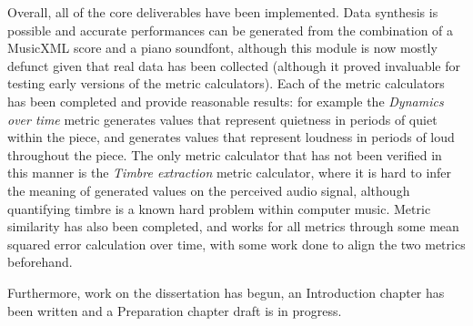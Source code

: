 \documentclass{article}
\begin{document}
Overall, all of the core deliverables have been implemented. Data synthesis is possible and accurate performances can be generated from the combination of a MusicXML score and a piano soundfont, although this module is now mostly defunct given that real data has been collected (although it proved invaluable for testing early versions of the metric calculators). Each of the metric calculators has been completed and provide reasonable results: for example the \textit{Dynamics over time} metric generates values that represent quietness in periods of quiet within the piece, and generates values that represent loudness in periods of loud throughout the piece. The only metric calculator that has not been verified in this manner is the \textit{Timbre extraction} metric calculator, where it is hard to infer the meaning of generated values on the perceived audio signal, although quantifying timbre is a known hard problem within computer music. Metric similarity has also been completed, and works for all metrics through some mean squared error calculation over time, with some work done to align the two metrics beforehand.

Furthermore, work on the dissertation has begun, an Introduction chapter has been written and a Preparation chapter draft is in progress.




    
\end{document}
